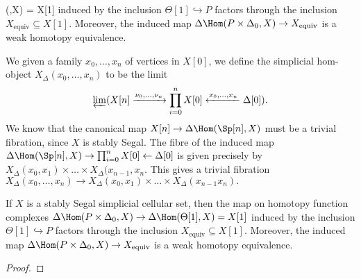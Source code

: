 

\to \Delta\Hom(\Theta[1],X) = X[1]\) induced by the inclusion \(\Theta[1]\hookrightarrow P\) factors through the inclusion  \(X_{\operatorname{equiv}}\subseteq X[1]\).  Moreover, the induced map \(\Delta\Hom(P\times \Delta_0, X)\to X_{\operatorname{equiv}}\) is a weak homotopy equivalence.

We given a family \(x_0,\dots, x_n\) of vertices in \(X[0]\), we define the simplicial hom-object \(X_\Delta(x_0,\dots,x_n)\) to be the limit  \[\varprojlim(X[n]\xrightarrow{\nu_0,\dots,\nu_n} \prod_{i=0}^n X[0] \xleftarrow{x_0,\dots,x_n} \Delta[0]).\]  We know that the canonical map \(X[n] \to \Delta\Hom(\Sp[n], X)\) must be a trivial fibration, since \(X\) is stably Segal. The fibre of the induced map \(\Delta\Hom(\Sp[n],X)\to \prod_{i=0}^n X[0] \leftarrow \Delta[0] \) is given precisely by \(X_\Delta(x_0,x_1)\times \dots \times X_\Delta(x_{n-1}, x_n\). This gives a trivial fibration \(X_\Delta(x_0,\dots,x_n)\to X_\Delta(x_0, x_1) \times \dots \times X_\Delta(x_{n-1} x_n).\)  

\begin{thm} If \(X\) is a stably Segal simplicial cellular set, then the map on homotopy function complexes \(\Delta\Hom(P \times \Delta_0, X) \to \Delta\Hom(\Theta[1],X) = X[1]\) induced by the inclusion \(\Theta[1]\hookrightarrow P\) factors through the inclusion  \(X_{\operatorname{equiv}}\subseteq X[1]\).  Moreover, the induced map \(\Delta\Hom(P\times \Delta_0, X)\to X_{\operatorname{equiv}}\) is a weak homotopy equivalence.
\end{thm}    
\begin{proof}
\end{proof}
